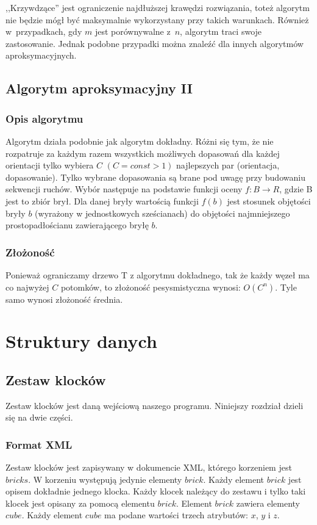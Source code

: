 \documentclass[12pt]{article}
\begin{document}
,,Krzywdzące'' jest ograniczenie najdłuższej krawędzi rozwiązania, toteż
algorytm nie będzie mógł być maksymalnie wykorzystany przy takich
warunkach. Również w~przypadkach, gdy $m$ jest porównywalne z~$n$,
algorytm traci swoje zastosowanie. Jednak podobne przypadki można znaleźć
dla innych algorytmów aproksymacyjnych.

\subsection{Algorytm aproksymacyjny II}
\subsubsection{Opis algorytmu}
Algorytm działa podobnie jak algorytm dokładny. Różni się tym, że nie rozpatruje za każdym razem wszystkich
możliwych dopasowań dla każdej orientacji tylko wybiera  $C$ $(C=const > 1)$ najlepszych par (orientacja, dopasowanie).
Tylko wybrane dopasowania są brane pod uwagę przy budowaniu sekwencji ruchów. Wybór następuje na podstawie funkcji 
oceny $f: B \rightarrow R$, gdzie B jest to zbiór brył. Dla danej bryły wartością funkcji $f(b)$ jest stosunek objętości
bryły $b$ (wyrażony w jednostkowych sześcianach) do objętości najmniejszego prostopadłościanu zawierającego bryłę $b$.
\subsubsection{Złożoność}
Ponieważ ograniczamy drzewo T z algorytmu dokładnego, tak że każdy węzeł ma co najwyżej $C$ potomków, to 
złożoność pesysmistyczna wynosi: $O(C^n)$. Tyle samo wynosi złożoność średnia.

\section{Struktury danych}

\subsection{Zestaw klocków}
Zestaw klocków jest daną wejściową naszego programu. Niniejszy rozdział
dzieli się na dwie części.

\subsubsection{Format XML}\label{sec:zapis}
Zestaw klocków jest zapisywany w dokumencie XML, którego korzeniem jest
$bricks$. W korzeniu występują jedynie elementy $brick$. Każdy element
$brick$ jest opisem dokładnie jednego klocka. Każdy klocek należący do
zestawu i tylko taki klocek jest opisany za pomocą elementu $brick$.
Element $brick$ zawiera elementy $cube$. Każdy element $cube$ ma podane
wartości trzech atrybutów: $x$, $y$ i $z$.
\end{document}
